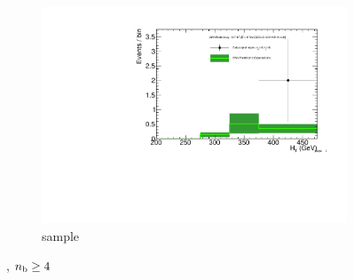 \begin{figure}[h!]
\begin{subfigure}[b]{0.48\textwidth}
    \includegraphics[width=\textwidth,page=4]
    {Figs/results/v0/greenBand/bestFit_2012dev_RQcdZero_fZinvAll_ge4b_ge4j-1_smOnly}
    \caption{\mj sample}
  \end{subfigure}
  \caption{\njhigh, $n_{\text{b}} \geq 4$}
  \label{fig:green_fits_ge4b_ge4j}
\end{figure}


